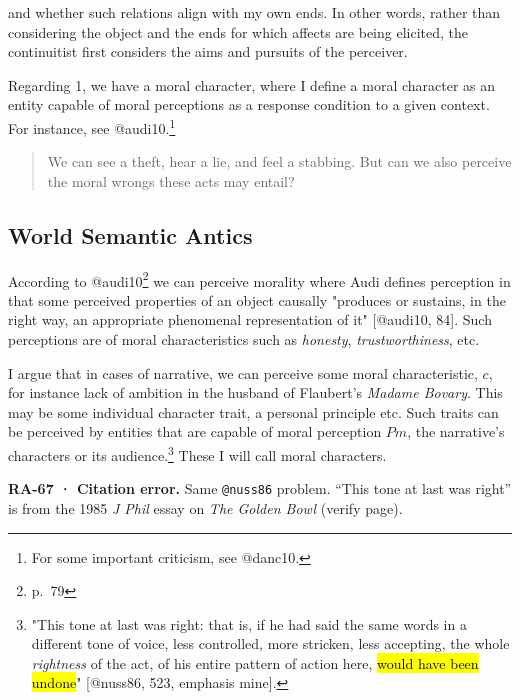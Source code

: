 \documentclass[
  letterpaper,
  DIV=11,
  numbers=noendperiod]{scrartcl}
\theoremstyle{remark}
\begin{document}
\noindent and whether such relations align with my own ends. In other
words, rather than considering the object and the ends for which affects
are being elicited, the continuitist first considers the aims and
pursuits of the perceiver.

Regarding 1, we have a moral character, where I define a moral character
as an entity capable of moral perceptions as a response condition to a
given context. For instance, see @audi10.\footnote{For some important
  criticism, see @danc10.}

\begin{quote}
We can see a theft, hear a lie, and feel a stabbing. But can we also
perceive the moral wrongs these acts may entail?
\end{quote}

\subsection{World Semantic Antics}\label{world-semantic-antics}

According to @audi10\footnote{p.~79} we can perceive morality where Audi
defines perception in that some perceived properties of an object
causally "produces or sustains, in the right way, an appropriate
phenomenal representation of it" {[}@audi10, 84{]}. Such perceptions are
of moral characteristics such as \emph{honesty}, \emph{trustworthiness},
etc.

I argue that in cases of narrative, we can perceive some moral
characteristic, \(c\), for instance lack of ambition in the husband of
Flaubert's \emph{Madame Bovary}. This may be some individual character
trait, a personal principle etc. Such traits can be perceived by
entities that are capable of moral perception \(Pm\), the narrative's
characters or its audience.\footnote{"\textquotesingle This tone at last
  was right\textquotesingle: that is, if he had said the same words in a
  different tone of voice, less controlled, more stricken, less
  accepting, the whole \emph{rightness} of the act, of his entire
  pattern of action here, \hl{would have been undone}" {[}@nuss86, 523,
  emphasis mine{]}.} These I will call moral characters.

\begin{tcolorbox}[enhanced jigsaw, arc=.35mm, bottomrule=.15mm, bottomtitle=1mm, breakable, colback=white, colbacktitle=quarto-callout-warning-color!10!white, colframe=quarto-callout-warning-color-frame, coltitle=black, left=2mm, leftrule=.75mm, opacityback=0, opacitybacktitle=0.6, rightrule=.15mm, title=\textcolor{quarto-callout-warning-color}{\faExclamationTriangle}\hspace{0.5em}{Warning}, titlerule=0mm, toprule=.15mm, toptitle=1mm]

\textbf{RA-67 · Citation error.} Same \texttt{@nuss86} problem. ``This
tone at last was right'' is from the 1985 \emph{J Phil} essay on
\emph{The Golden Bowl} (verify page).

\end{tcolorbox}
\end{document}
